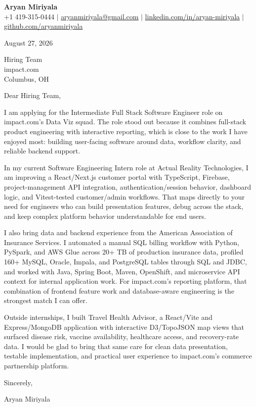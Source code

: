 \documentclass[letterpaper,11pt]{article}
\begin{document}
\begin{center}
  {\Large \textbf{Aryan Miriyala}}\\
  \small
  +1 419-315-0444 $|$
  \href{mailto:aryanmiriyala@gmail.com}{aryanmiriyala@gmail.com} $|$
  \href{https://www.linkedin.com/in/aryan-miriyala-7788a21b6/}{linkedin.com/in/aryan-miriyala} $|$
  \href{https://github.com/aryanmiriyala}{github.com/aryanmiriyala}
\end{center}

\vspace{8pt}

August 27, 2026

Hiring Team\\
impact.com\\
Columbus, OH

Dear Hiring Team,

I am applying for the Intermediate Full Stack Software Engineer role on impact.com's Data Viz squad. The role stood out because it combines full-stack product engineering with interactive reporting, which is close to the work I have enjoyed most: building user-facing software around data, workflow clarity, and reliable backend support.

In my current Software Engineering Intern role at Actual Reality Technologies, I am improving a React/Next.js customer portal with TypeScript, Firebase, project-management API integration, authentication/session behavior, dashboard logic, and Vitest-tested customer/admin workflows. That maps directly to your need for engineers who can build presentation features, debug across the stack, and keep complex platform behavior understandable for end users.

I also bring data and backend experience from the American Association of Insurance Services. I automated a manual SQL billing workflow with Python, PySpark, and AWS Glue across 20+ TB of production insurance data, profiled 160+ MySQL, Oracle, Impala, and PostgreSQL tables through SQL and JDBC, and worked with Java, Spring Boot, Maven, OpenShift, and microservice API context for internal application work. For impact.com's reporting platform, that combination of frontend feature work and database-aware engineering is the strongest match I can offer.

Outside internships, I built Travel Health Advisor, a React/Vite and Express/MongoDB application with interactive D3/TopoJSON map views that surfaced disease risk, vaccine availability, healthcare access, and recovery-rate data. I would be glad to bring that same care for clean data presentation, testable implementation, and practical user experience to impact.com's commerce partnership platform.

Sincerely,

Aryan Miriyala
\end{document}
